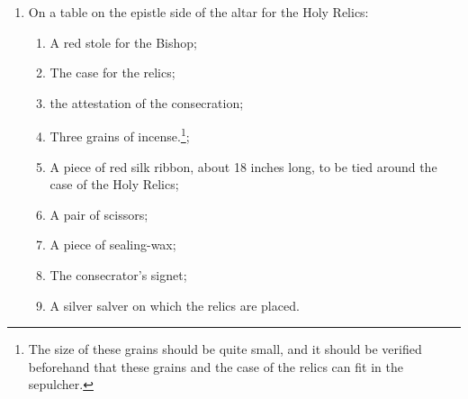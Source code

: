 \documentclass[letterpaper]{report}
\begin{document}
{\begin{enumerate}[label=\Roman*.]
\begin{enumerate}[lable=\arabic*.]
                \item A small urn or tabernacle, ornamented with red silk, in
                    which the case of the relics will be placed. A silver
                    salver with a small red cloth may substitute;
                
                \item Near the altar a bier for carrying the relics;

                \item Two candlesticks.

            \end{enumerate}

        \item On a table on the epistle side of the altar for the Holy Relics:

            \begin{enumerate}[lable=\arabic*.]

                \item A red stole for the Bishop;
                    
                \item The case for the relics;

                \item the attestation of the consecration;

                \item Three grains of incense.\footnote{The size of these
                    grains should be quite small, and it should be verified
                    beforehand that these grains and the case of the relics can
                    fit in the sepulcher.};

                \item A piece of red silk ribbon, about 18 inches long, to be
                    tied around the case of the Holy Relics;

                \item A pair of scissors;

                \item A piece of sealing-wax;

                \item The consecrator's signet;

                \item A silver salver on which the relics are placed.

            \end{enumerate}


\end{enumerate}}
\end{document}
